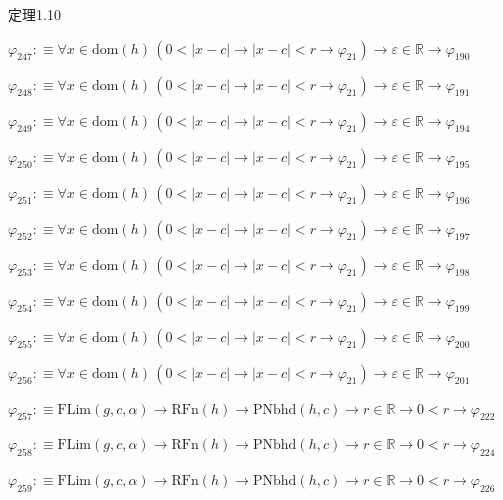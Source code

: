 \begin{fullproof}{定理1.10}
\begin{abbrevlist}
\item $\varphi_{247} :\equiv \forall x \in \mathrm{dom}(h)\,(0 < \lvert x - c \rvert \to \lvert x - c \rvert < r \to \varphi_{21}) \to \varepsilon \in \mathbb{R} \to \varphi_{190}$
\item $\varphi_{248} :\equiv \forall x \in \mathrm{dom}(h)\,(0 < \lvert x - c \rvert \to \lvert x - c \rvert < r \to \varphi_{21}) \to \varepsilon \in \mathbb{R} \to \varphi_{191}$
\item $\varphi_{249} :\equiv \forall x \in \mathrm{dom}(h)\,(0 < \lvert x - c \rvert \to \lvert x - c \rvert < r \to \varphi_{21}) \to \varepsilon \in \mathbb{R} \to \varphi_{194}$
\item $\varphi_{250} :\equiv \forall x \in \mathrm{dom}(h)\,(0 < \lvert x - c \rvert \to \lvert x - c \rvert < r \to \varphi_{21}) \to \varepsilon \in \mathbb{R} \to \varphi_{195}$
\item $\varphi_{251} :\equiv \forall x \in \mathrm{dom}(h)\,(0 < \lvert x - c \rvert \to \lvert x - c \rvert < r \to \varphi_{21}) \to \varepsilon \in \mathbb{R} \to \varphi_{196}$
\item $\varphi_{252} :\equiv \forall x \in \mathrm{dom}(h)\,(0 < \lvert x - c \rvert \to \lvert x - c \rvert < r \to \varphi_{21}) \to \varepsilon \in \mathbb{R} \to \varphi_{197}$
\item $\varphi_{253} :\equiv \forall x \in \mathrm{dom}(h)\,(0 < \lvert x - c \rvert \to \lvert x - c \rvert < r \to \varphi_{21}) \to \varepsilon \in \mathbb{R} \to \varphi_{198}$
\item $\varphi_{254} :\equiv \forall x \in \mathrm{dom}(h)\,(0 < \lvert x - c \rvert \to \lvert x - c \rvert < r \to \varphi_{21}) \to \varepsilon \in \mathbb{R} \to \varphi_{199}$
\item $\varphi_{255} :\equiv \forall x \in \mathrm{dom}(h)\,(0 < \lvert x - c \rvert \to \lvert x - c \rvert < r \to \varphi_{21}) \to \varepsilon \in \mathbb{R} \to \varphi_{200}$
\item $\varphi_{256} :\equiv \forall x \in \mathrm{dom}(h)\,(0 < \lvert x - c \rvert \to \lvert x - c \rvert < r \to \varphi_{21}) \to \varepsilon \in \mathbb{R} \to \varphi_{201}$
\item $\varphi_{257} :\equiv \mathrm{FLim}(g,c,\alpha) \to \mathrm{RFn}(h) \to \mathrm{PNbhd}(h,c) \to r \in \mathbb{R} \to 0 < r \to \varphi_{222}$
\item $\varphi_{258} :\equiv \mathrm{FLim}(g,c,\alpha) \to \mathrm{RFn}(h) \to \mathrm{PNbhd}(h,c) \to r \in \mathbb{R} \to 0 < r \to \varphi_{224}$
\item $\varphi_{259} :\equiv \mathrm{FLim}(g,c,\alpha) \to \mathrm{RFn}(h) \to \mathrm{PNbhd}(h,c) \to r \in \mathbb{R} \to 0 < r \to \varphi_{226}$

\end{abbrevlist}
\end{fullproof}
